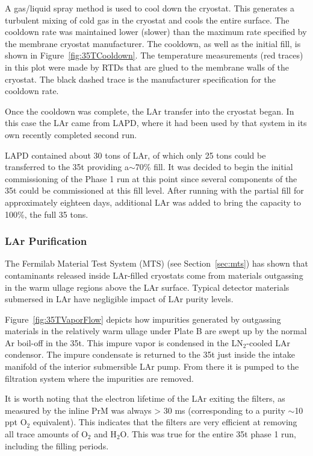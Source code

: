 A gas/liquid spray method is used to cool down the cryostat. This generates a turbulent mixing 
of cold gas in the cryostat and cools the entire surface. The cooldown rate was %
maintained lower (slower) than
the maximum rate specified by the membrane cryostat manufacturer. The cooldown, as well as the initial 
fill, is shown in Figure~\ref{fig:35TCooldown}. The temperature measurements (red traces) in this plot 
were made by RTDs that are glued to the membrane walls of the cryostat. The black dashed trace is the 
manufacturer specification for the cooldown rate.

Once the cooldown was complete, the LAr transfer into the cryostat began. %
In this case the LAr came from LAPD, where it had been used by that system in its own recently completed 
second run\cite{bib:lapdP07005}. 

LAPD contained about 30 tons of LAr, of which only 25 tons could be transferred to the 35t providing a$\sim$70\% fill. It was decided to begin the initial commissioning of the 
Phase 1 run at this point since several components of the 35t could be commissioned at this fill level. After running with the partial fill for approximately eighteen days, additional LAr was 
added to bring the capacity to 100\%, the full 35 tons.

\subsubsection{LAr Purification}

The Fermilab Material Test System (MTS)\cite{bib:Voiron9940,bib:mtslapd308} (see Section~\ref{sec:mts}) has shown that contaminants released inside LAr-filled cryostats come from materials outgassing in the warm ullage regions above the LAr surface. Typical detector materials submersed in LAr have negligible impact of LAr purity levels. 

Figure~\ref{fig:35TVaporFlow} depicts how impurities generated by outgassing materials in the 
relatively warm ullage under Plate B are swept up by the normal Ar boil-off in the 35t. This impure vapor 
is condensed in the LN$_2$-cooled LAr condensor. The impure condensate is returned to the 35t just inside 
the intake manifold of the interior submersible LAr pump. From there it is pumped to the filtration 
system where the impurities are removed.

It is worth noting that the electron lifetime of  the LAr exiting the filters, as measured by the inline PrM was always  
> 30 ms (corresponding to a purity $\sim$10 ppt O$_2$ equivalent). This indicates that the filters are very efficient at removing all 
trace amounts of O$_2$ and H$_2$O. This was true for the entire 35t phase 1 run, including the filling periods.

